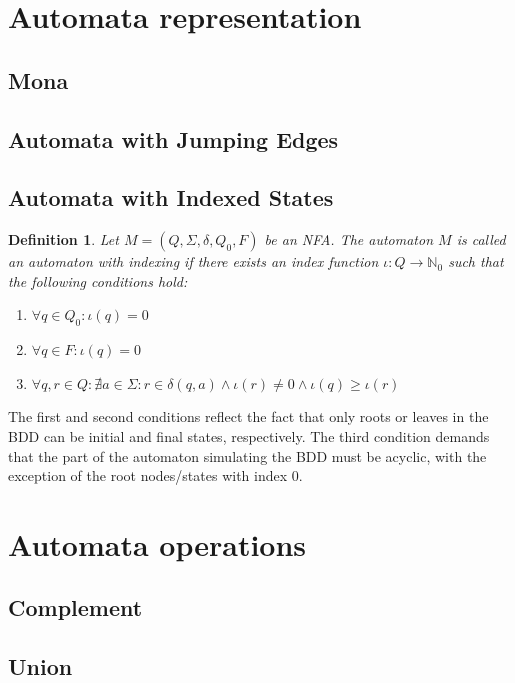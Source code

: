 \documentclass[pdflatex,sn-mathphys-num]{sn-jnl}%
\theoremstyle{thmstyleone}%
\theoremstyle{thmstyletwo}%
\theoremstyle{thmstylethree}%
\newtheorem{definition}{Definition}%
\begin{document}
\section{Automata representation}
    \subsection{Mona}
    \subsection{Automata with Jumping Edges}
    \subsection{Automata with Indexed States}
        \begin{definition}
            Let $M = (Q, \Sigma, \delta, Q_0, F)$ be an NFA. The automaton $M$ is called an automaton with indexing if there exists an index function $\iota : Q \rightarrow \mathbb{N}_0$ such that the following conditions hold:
            \begin{enumerate}[noindent]
                \item $\forall q \in Q_0 : \iota(q) = 0$
                \item $\forall q \in F : \iota(q) = 0$
                \item $\forall q, r \in Q : \nexists a \in \Sigma : r \in \delta(q, a) \land \iota(r) \neq 0 \land \iota(q) \geq \iota(r)$
            \end{enumerate}
        \end{definition}

        The first and second conditions reflect the fact that only roots or leaves in the BDD can be initial and final states, respectively. The third condition demands that the part of the automaton simulating the BDD must be acyclic, with the exception of the root nodes/states with index 0.

\section{Automata operations}
    \subsection{Complement}
    \subsection{Union}
\end{document}
